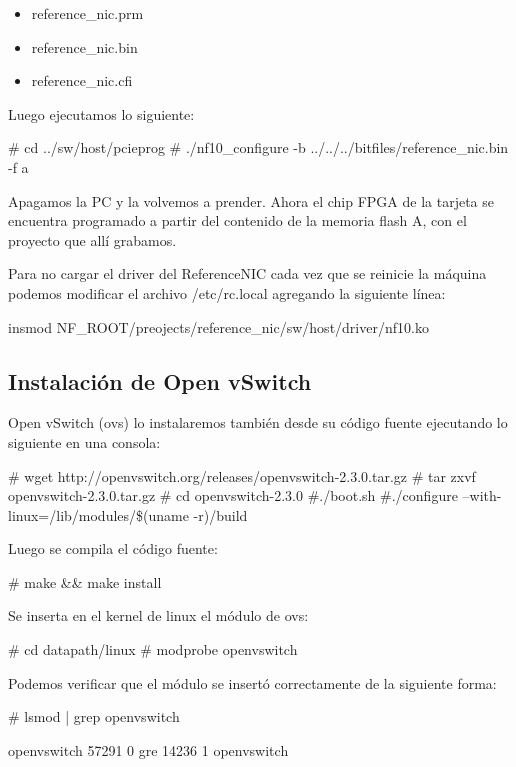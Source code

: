 \begin{itemize}
\item reference\_nic.prm
\item reference\_nic.bin
\item reference\_nic.cfi
\end{itemize}

Luego ejecutamos lo siguiente:

\begin{bash}
# cd ../sw/host/pcieprog
# ./nf10_configure -b ../../../bitfiles/reference_nic.bin -f a
\end{bash}

Apagamos la PC y la volvemos a prender. Ahora el chip FPGA de la tarjeta se encuentra programado a partir del contenido de la memoria flash A, con el proyecto que allí grabamos.

Para no cargar el driver del ReferenceNIC cada vez que se reinicie la máquina podemos modificar el archivo /etc/rc.local agregando la siguiente línea:

\begin{bash}
insmod NF_ROOT/preojects/reference_nic/sw/host/driver/nf10.ko
\end{bash}

\subsection{Instalación de Open vSwitch}
Open vSwitch (ovs) lo instalaremos también desde su código fuente ejecutando lo siguiente en una consola:

\begin{bash}
# wget http://openvswitch.org/releases/openvswitch-2.3.0.tar.gz
# tar zxvf openvswitch-2.3.0.tar.gz
# cd openvswitch-2.3.0
#./boot.sh
#./configure --with-linux=/lib/modules/\$(uname -r)/build
\end{bash}

Luego se compila el código fuente:

\begin{bash}
# make && make install
\end{bash}

Se inserta en el kernel de linux el módulo de ovs:

\begin{bash}
# cd datapath/linux
# modprobe openvswitch
\end{bash}

Podemos verificar que el módulo se insertó correctamente de la siguiente forma:

\begin{bash}
# lsmod | grep openvswitch

openvswitch    57291      0  
gre         14236         1     openvswitch
\end{bash}

